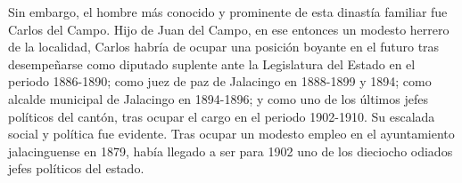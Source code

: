 \documentclass[14pt,twoside,final]{extbook} %
\begin{document}
Sin embargo, el hombre más conocido y prominente de esta dinastía familiar fue Carlos del Campo. Hijo de Juan del Campo, en ese entonces un modesto herrero de la localidad, Carlos habría de ocupar una posición boyante en el futuro tras desempeñarse como diputado suplente ante la Legislatura del Estado en el periodo 1886-1890; como juez de paz de Jalacingo en 1888-1899 y 1894; como alcalde municipal de Jalacingo en 1894-1896; y como uno de los últimos jefes políticos del cantón, tras ocupar el cargo en el periodo 1902-1910. Su escalada social y política fue evidente. Tras ocupar un modesto empleo en el ayuntamiento jalacinguense en 1879, había llegado a ser para 1902 uno de los dieciocho odiados jefes políticos del estado.
\end{document}
